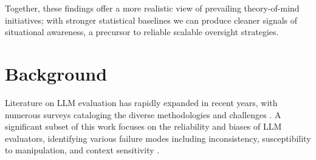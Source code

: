 \documentclass{article}
\theoremstyle{plain}
\theoremstyle{definition}
\theoremstyle{remark}
\begin{document}
Together, these findings offer a more realistic view of prevailing theory-of-mind initiatives; with stronger statistical baselines we can produce cleaner signals of situational awareness, a precursor to reliable scalable oversight strategies.

\section{Background}
Literature on LLM evaluation has rapidly expanded in recent years, with numerous surveys cataloging the diverse methodologies and challenges \cite{zhengJudgingLLMasaJudgeMTBench2023,shenLargeLanguageModels2023,chenHumansLLMsJudge2024,liLLMsasJudgesComprehensiveSurvey2024, liGenerationJudgmentOpportunities2025, guSurveyLLMasaJudge2025}. A significant subset of this work focuses on the reliability and biases of LLM evaluators, identifying various failure modes including inconsistency, susceptibility to manipulation, and context sensitivity \cite{kooBenchmarkingCognitiveBiases2024,yeJusticePrejudiceQuantifying2024, dietzLLMEvaluationTropesPerspectives2025}.
\end{document}
